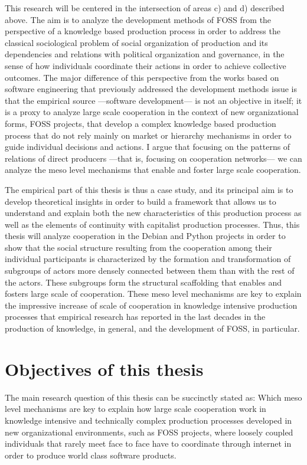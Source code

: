 This research will be centered in the intersection of areas c) and d) described above. The aim is to analyze the development methods of FOSS from the perspective of a knowledge based production process in order to address the classical sociological problem of social organization of production and its dependencies and relations with political organization and governance, in the sense of how individuals coordinate their actions in order to achieve collective outcomes. The major difference of this perspective from the works based on software engineering that previously addressed the development methods issue is that the empirical source ---software development--- is not an objective in itself; it is a proxy to analyze large scale cooperation in the context of new organizational forms, FOSS projects, that develop a complex knowledge based production process that do not rely mainly on market or hierarchy mechanisms in order to guide individual decisions and actions. I argue that focusing on the patterns of relations of direct producers ---that is, focusing on cooperation networks--- we can analyze the meso level mechanisms that enable and foster large scale cooperation.

The empirical part of this thesis is thus a case study, and its principal aim is to develop theoretical insights in order to build a framework that allows us to understand and explain both the new characteristics of this production process as well as the elements of continuity with capitalist production processes. Thus, this thesis will analyze cooperation in the Debian and Python projects in order to show that the social structure resulting from the cooperation among their individual participants is characterized by the formation and transformation of subgroups of actors more densely connected between them than with the rest of the actors. These subgroups form the structural scaffolding that enables and fosters large scale of cooperation. These meso level mechanisms are key to explain the impressive increase of scale of cooperation in knowledge intensive production processes that empirical research has reported in the last decades in the production of knowledge, in general, and the development of FOSS, in particular.

\section{Objectives of this thesis}

The main research question of this thesis can be succinctly stated as: Which meso level mechanisms are key to explain how large scale cooperation work in knowledge intensive and technically complex production processes developed in new organizational environments, such as FOSS projects, where loosely coupled individuals that rarely meet face to face have to coordinate through internet in order to produce world class software products.

